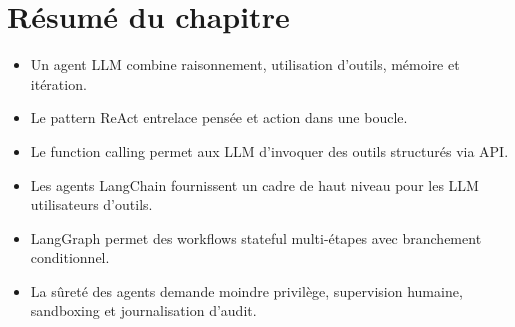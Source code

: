 \section{R\'esum\'e du chapitre}

\begin{itemize}
  \item Un agent LLM combine raisonnement, utilisation d'outils, m\'emoire et it\'eration.
  \item Le pattern ReAct entrelace pens\'ee et action dans une boucle.
  \item Le function calling permet aux LLM d'invoquer des outils structur\'es via API.
  \item Les agents LangChain fournissent un cadre de haut niveau pour les LLM utilisateurs d'outils.
  \item LangGraph permet des workflows stateful multi-\'etapes avec branchement conditionnel.
  \item La s\^uret\'e des agents demande moindre privil\`ege, supervision humaine, sandboxing et journalisation d'audit.
\end{itemize}

